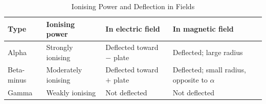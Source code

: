 \begin{table}[H]
\centering
\caption{Ionising Power and Deflection in Fields}
\label{tab:radiation_properties}
\small
\begin{tabular}{llll}
\toprule
\textbf{Type} & \textbf{Ionising power} &
\textbf{In electric field} & \textbf{In magnetic field}\\
\midrule
Alpha & Strongly ionising & Deflected toward $-$ plate &
  Deflected; large radius\\
Beta-minus & Moderately ionising & Deflected toward $+$ plate &
  Deflected; small radius, opposite to $\alpha$\\
Gamma & Weakly ionising & Not deflected &
  Not deflected\\
\bottomrule
\end{tabular}
\end{table}

